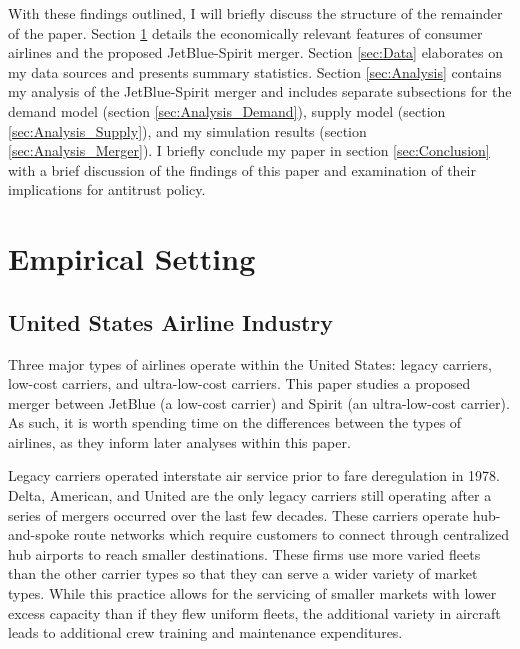 \documentclass{article}
\begin{document}
    With these findings outlined, I will briefly discuss the structure of the remainder of the paper. Section \ref{sec:Setting} details the economically relevant features of consumer airlines and the proposed JetBlue-Spirit merger. Section \ref{sec:Data} elaborates on my data sources and presents summary statistics. Section \ref{sec:Analysis} contains my analysis of the JetBlue-Spirit merger and includes separate subsections for the demand model (section \ref{sec:Analysis_Demand}), supply model (section \ref{sec:Analysis_Supply}), and my simulation results (section \ref{sec:Analysis_Merger}).  I briefly conclude my paper in section \ref{sec:Conclusion} with a brief discussion of the findings of this paper and examination of their implications for antitrust policy. 

  
	
	\section{Empirical Setting}
	\label{sec:Setting}
	
	\subsection{United States Airline Industry}
	\label{sec:Setting_Aviation}
	Three major types of airlines operate within the United States: legacy carriers, low-cost carriers, and ultra-low-cost carriers. This paper studies a proposed merger between JetBlue (a low-cost carrier) and Spirit (an ultra-low-cost carrier). As such, it is worth spending time on the differences between the types of airlines, as they inform later analyses within this paper. 	
    
	Legacy carriers operated interstate air service prior to fare deregulation in 1978. Delta, American, and United are the only legacy carriers still operating after a series of mergers occurred over the last few decades. These carriers operate hub-and-spoke route networks which require customers to connect through centralized hub airports to reach smaller destinations. These firms use more varied fleets than the other carrier types so that they can serve a wider variety of market types. While this practice allows for the servicing of smaller markets with lower excess capacity than if they flew uniform fleets, the additional variety in aircraft leads to additional crew training and maintenance expenditures.    
	
\end{document}
